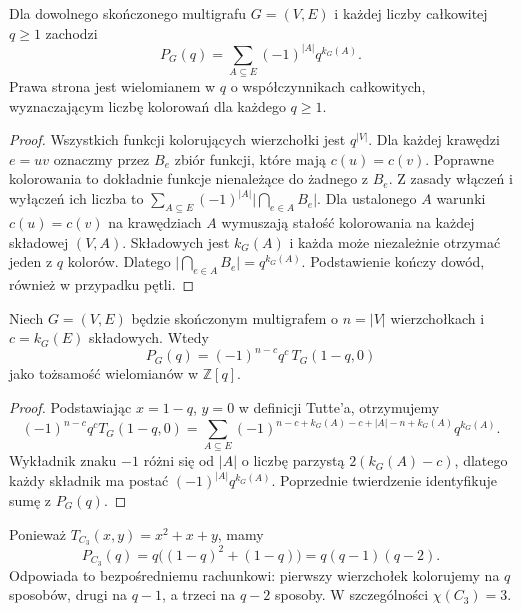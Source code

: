 \begin{twierdzenie}
\label{thm:tg-chromatic-inclusion}
Dla dowolnego skończonego multigrafu $G=(V,E)$ i każdej
liczby całkowitej $q\ge1$ zachodzi
\[
 P_G(q)=\sum_{A\subseteq E}(-1)^{|A|}q^{k_G(A)}.
\]
Prawa strona jest wielomianem w $q$ o współczynnikach
całkowitych, wyznaczającym liczbę kolorowań dla każdego $q\ge1$.
\end{twierdzenie}

\begin{proof}
Wszystkich funkcji kolorujących wierzchołki jest $q^{|V|}$.
Dla każdej krawędzi $e=uv$ oznaczmy przez $B_e$
zbiór funkcji, które mają $c(u)=c(v)$.
Poprawne kolorowania to dokładnie funkcje nienależące
do żadnego z $B_e$. Z zasady włączeń i wyłączeń ich liczba
to $\sum_{A\subseteq E}(-1)^{|A|}\bigl|\bigcap_{e\in A}B_e\bigr|$.
Dla ustalonego $A$ warunki $c(u)=c(v)$ na krawędziach $A$
wymuszają stałość kolorowania na każdej składowej $(V,A)$.
Składowych jest $k_G(A)$ i każda może niezależnie otrzymać
jeden z $q$ kolorów. Dlatego
$\bigl|\bigcap_{e\in A}B_e\bigr|=q^{k_G(A)}$.
Podstawienie kończy dowód, również w przypadku pętli.
\end{proof}

\begin{twierdzenie}
\label{thm:tg-chrom-tutte}
Niech $G=(V,E)$ będzie skończonym multigrafem o $n=|V|$
wierzchołkach i $c=k_G(E)$ składowych. Wtedy
\[
P_G(q)=(-1)^{n-c}q^c\,T_G(1-q,0)
\]
jako tożsamość wielomianów w $\mathbb Z[q]$.
\end{twierdzenie}

\begin{proof}
Podstawiając $x=1-q$, $y=0$ w definicji Tutte'a,
otrzymujemy
\[
(-1)^{n-c}q^c T_G(1-q,0)
=\sum_{A\subseteq E}
 (-1)^{n-c+k_G(A)-c+|A|-n+k_G(A)}q^{k_G(A)}.
\]
Wykładnik znaku $-1$ różni się od $|A|$ o liczbę parzystą
$2(k_G(A)-c)$, dlatego każdy składnik ma postać
$(-1)^{|A|}q^{k_G(A)}$. Poprzednie twierdzenie
identyfikuje sumę z $P_G(q)$.
\end{proof}

\begin{przyklad}
Ponieważ $T_{C_3}(x,y)=x^2+x+y$, mamy
\[
P_{C_3}(q)=q\bigl((1-q)^2+(1-q)\bigr)
=q(q-1)(q-2).
\]
Odpowiada to bezpośredniemu rachunkowi: pierwszy
wierzchołek kolorujemy na $q$ sposobów, drugi
na $q-1$, a trzeci na $q-2$ sposoby.
W szczególności $\chi(C_3)=3$.
\end{przyklad}

